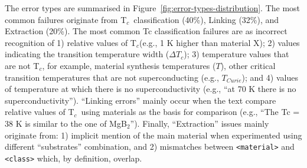 \documentclass[]{interact}
\theoremstyle{plain}%
\theoremstyle{definition}
\theoremstyle{remark}
\newcommand{\tc}{T$_{c}$}
\begin{document}
\begin{table}[ht]
    \centering
    \label{table:end2end-evaluation-summary}
\end{table}

The error types are summarised in Figure~\ref{fig:error-types-distribution}. The most common failures  originate from \tc~classification (40\%), Linking (32\%), and Extraction (20\%).
The most common Tc classification failures are as incorrect recognition of 1) relative values of \tc (e.g., 1 K higher than material X); 2) values indicating the transition temperature width ($\Delta T_{c}$); 3) temperature values that are not \tc, for example, material synthesis temperatures ($T$), other critical transition temperatures that are not superconducting (e.g., $T_{Curie}$); and 4) values of temperature at which there is no superconductivity (e.g., ``at 70 K there is no superconductivity'').
``Linking errors'' mainly occur when the text compare relative values of \tc~using materials as the basis for comparison (e.g., ``The Tc = 38 K is similar to the one of MgB$_{2}$'').
Finally, ``Extraction'' issues mainly originate from: 1) implicit mention of the main material when experimented using different ``substrates'' combination, and 2) mismatches between \texttt{<material>} and \texttt{<class>} which, by definition, overlap.
\end{document}
